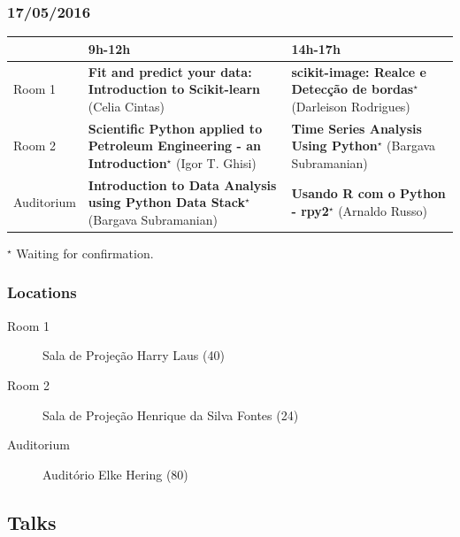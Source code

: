\documentclass[12pt]{article}
\begin{document}
\subsubsection*{17/05/2016}

\begin{center}
   {\footnotesize{%
     \begin{tabular}{@{}l p{5cm} p{5cm}@{}}
     \toprule
      & 9h-12h & 14h-17h\\\midrule
     Room 1 & \textbf{Fit and predict your data: Introduction to Scikit-learn} (Celia Cintas) & \textbf{scikit-image: Realce e Detecção de bordas$^\star$} (Darleison Rodrigues)\\
     Room 2 & \textbf{Scientific Python applied to Petroleum Engineering - an Introduction$^\star$} (Igor T. Ghisi) & \textbf{Time Series Analysis Using Python$^\star$} (Bargava Subramanian)\\
     Auditorium & \textbf{Introduction to Data Analysis using Python Data Stack$^\star$} (Bargava Subramanian) & \textbf{Usando R com o Python - rpy2$^\star$} (Arnaldo Russo)\\\bottomrule
   \end{tabular}
 }}
\end{center}
{\hspace*{9.3cm}\scriptsize{$^\star$ Waiting for confirmation.}}

\vspace*{-0.5cm}
\subsubsection*{Locations}
{\footnotesize{%
\begin{description}
   \item[Room 1] Sala de Projeção Harry Laus (40)
   \item[Room 2] Sala de Projeção Henrique da Silva Fontes (24)
   \item[Auditorium] Auditório Elke Hering (80)
\end{description}
}}

\subsection*{Talks}
\end{document}
